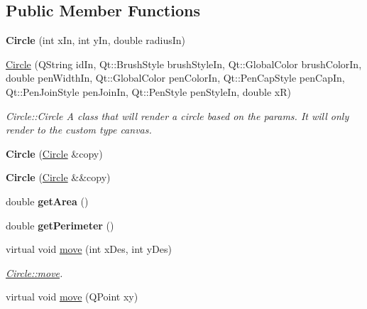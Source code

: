 \subsection*{Public Member Functions}
\begin{DoxyCompactItemize}
\item 
\mbox{\label{class_circle_ab672be11e6bca406b9c4f3feb4b4aad3}} 
{\bfseries Circle} (int x\+In, int y\+In, double radius\+In)
\item 
\hyperlink{class_circle_a4b41e38613114920686bbfea15ded361}{Circle} (Q\+String id\+In, Qt\+::\+Brush\+Style brush\+Style\+In, Qt\+::\+Global\+Color brush\+Color\+In, double pen\+Width\+In, Qt\+::\+Global\+Color pen\+Color\+In, Qt\+::\+Pen\+Cap\+Style pen\+Cap\+In, Qt\+::\+Pen\+Join\+Style pen\+Join\+In, Qt\+::\+Pen\+Style pen\+Style\+In, double xR)
\begin{DoxyCompactList}\small\item\em Circle\+::\+Circle A class that will render a circle based on the params. It will only render to the custom type canvas. \end{DoxyCompactList}\item 
\mbox{\label{class_circle_a5df00ac5563cbef6e87faa7f2c2a446b}} 
{\bfseries Circle} (\hyperlink{class_circle}{Circle} \&copy)
\item 
\mbox{\label{class_circle_a3e4cff49aa70b470ca6abb2923970d80}} 
{\bfseries Circle} (\hyperlink{class_circle}{Circle} \&\&copy)
\item 
\mbox{\label{class_circle_a99fe1cbabbf3a9ccae51832376c5e8d4}} 
double {\bfseries get\+Area} ()
\item 
\mbox{\label{class_circle_afee5f4743c89e48e462e5f56aa605669}} 
double {\bfseries get\+Perimeter} ()
\item 
virtual void \hyperlink{class_circle_a6ed1a2d29c5dc49a2ae3051449576577}{move} (int x\+Des, int y\+Des)
\begin{DoxyCompactList}\small\item\em \hyperlink{class_circle_a6ed1a2d29c5dc49a2ae3051449576577}{Circle\+::move}. \end{DoxyCompactList}\item 
virtual void \hyperlink{class_circle_a5f02de3ad7e992a689b9f9e88643076c}{move} (Q\+Point xy)

\end{DoxyCompactItemize}
